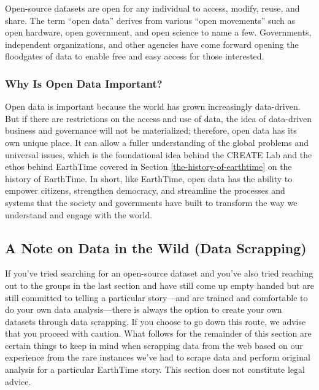 \documentclass[
  12pt,
]{krantz}
\begin{document}
Open-source datasets are open for any individual to access, modify, reuse, and share. The term ``open data'' derives from various ``open movements'' such as open hardware, open government, and open science to name a few. Governments, independent organizations, and other agencies have come forward opening the floodgates of data to enable free and easy access for those interested.

\hypertarget{why-is-open-data-important}{%
\subsubsection*{Why Is Open Data Important?}\label{why-is-open-data-important}}


Open data is important because the world has grown increasingly data-driven. But if there are restrictions on the access and use of data, the idea of data-driven business and governance will not be materialized; therefore, open data has its own unique place. It can allow a fuller understanding of the global problems and universal issues, which is the foundational idea behind the CREATE Lab and the ethos behind EarthTime covered in Section \ref{the-history-of-earthtime} on the history of EarthTime. In short, like EarthTime, open data has the ability to empower citizens, strengthen democracy, and streamline the processes and systems that the society and governments have built to transform the way we understand and engage with the world.

\hypertarget{a-note-on-data-in-the-wild-data-scrapping}{%
\subsection{A Note on Data in the Wild (Data Scrapping)}\label{a-note-on-data-in-the-wild-data-scrapping}}

If you've tried searching for an open-source dataset and you've also tried reaching out to the groups in the last section and have still come up empty handed but are still committed to telling a particular story---and are trained and comfortable to do your own data analysis---there is always the option to create your own datasets through data scrapping. If you choose to go down this route, we advise that you proceed with caution. What follows for the remainder of this section are certain things to keep in mind when scrapping data from the web based on our experience from the rare instances we've had to scrape data and perform original analysis for a particular EarthTime story. This section does not constitute legal advice.
\end{document}
